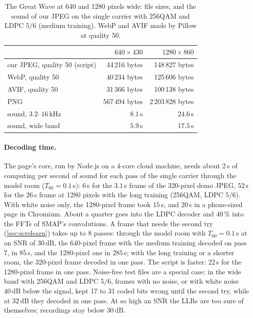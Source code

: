 \documentclass[11pt,a4paper]{article}
\newcommand{\kHz}{\,\mathrm{kHz}}
\newcommand{\dB}{\,\mathrm{dB}}
\theoremstyle{remark}
\begin{document}
\begin{table}[ht]
\centering
\caption{The Great Wave at 640 and 1280 pixels wide: file sizes, and the sound of our JPEG on the single carrier with 256QAM and LDPC $5/6$ (medium training). WebP and AVIF made by Pillow at quality 50.}
\label{tab:formats}
\small
\begin{tabular}{lrr}
\toprule
 & $640 \times 430$ & $1280 \times 860$\\
\midrule
our JPEG, quality 50 (script) & 44\,216 bytes & 148\,827 bytes\\
WebP, quality 50 & 40\,234 bytes & 125\,606 bytes\\
AVIF, quality 50 & 31\,366 bytes & 100\,138 bytes\\
PNG & 567\,494 bytes & 2\,203\,828 bytes\\
sound, $3.2$--$16\kHz$ & $8.1$\,s & $24.6$\,s\\
sound, wide band & $5.9$\,s & $17.5$\,s\\
\bottomrule
\end{tabular}
\end{table}

\paragraph{Decoding time.}
The page's core, run by Node.js on a 4-core cloud machine, needs about 2\,s of computing per second of sound for each pass of the single carrier through the model room ($T_{60} = 0.1$\,s): $6$\,s for the $3.1$\,s frame of the 320-pixel demo JPEG, $52$\,s for the $26$\,s frame at 1280 pixels with the long training (256QAM, LDPC $5/6$). With white noise only, the 1280-pixel frame took $15$\,s, and $20$\,s in a phone-sized page in Chromium. About a quarter goes into the LDPC decoder and $40\,\%$ into the FFTs of SMAP's convolutions. A frame that needs the second try (\cref{sec:screlearn}) takes up to 8 passes: through the model room with $T_{60} = 0.1$\,s at an SNR of $30\dB$, the 640-pixel frame with the medium training decoded on pass 7, in 85\,s, and the 1280-pixel one in $285$\,s; with the long training or a shorter room, the 320-pixel frame decoded in one pass. The script is faster: 22\,s for the 1280-pixel frame in one pass.
Noise-free test files are a special case: in the wide band with 256QAM and LDPC $5/6$, frames with no noise, or with white noise $40\dB$ below the signal, kept 17 to 31 coded bits wrong until the second try, while at $32\dB$ they decoded in one pass. At so high an SNR the LLRs are too sure of themselves; recordings stay below $30\dB$.
\end{document}
